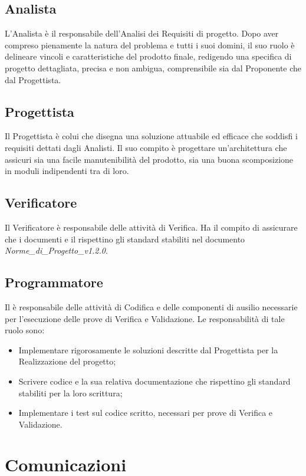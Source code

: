 \subsection{Analista}
\label{2.3}
L'Analista è il responsabile dell'Analisi dei Requisiti di progetto. Dopo aver compreso pienamente la natura del problema e tutti i suoi domini, il suo ruolo è delineare vincoli e caratteristiche del prodotto finale, redigendo una specifica di progetto dettagliata, precisa e non ambigua, comprensibile sia dal Proponente che dal Progettista.

\subsection{Progettista}
\label{2.4}
Il Progettista è colui che disegna una soluzione attuabile ed efficace che soddisfi i requisiti dettati dagli Analisti. Il suo compito è progettare un'architettura che assicuri sia una facile manutenibilità del prodotto, sia una buona scomposizione in moduli indipendenti tra di loro.

\subsection{Verificatore}
\label{2.5}
Il Verificatore è responsabile delle attività di Verifica. Ha il compito di assicurare che i documenti e il  rispettino gli standard stabiliti nel documento \emph{Norme\_di\_Progetto\_v1.2.0}.

\subsection{Programmatore}
\label{2.6}
Il  è responsabile delle attività di Codifica e delle componenti di ausilio
necessarie per l'esecuzione delle prove di Verifica e Validazione. Le responsabilità di tale ruolo sono:
\begin{itemize}
\item Implementare rigorosamente le soluzioni descritte dal Progettista per la Realizzazione del progetto;
\item Scrivere codice e la sua relativa documentazione che rispettino gli standard stabiliti per la loro scrittura;
\item Implementare i test sul codice scritto, necessari per prove di Verifica e Validazione.
\end{itemize}

\newpage
\section{Comunicazioni}
\label{3.0}

